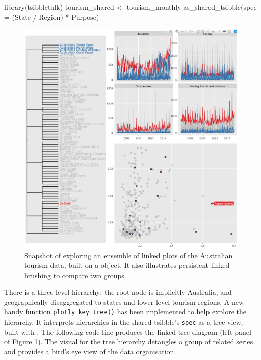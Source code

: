 \begin{Schunk}
\begin{Sinput}
library(tsibbletalk)
tourism_shared <- tourism_monthly %
  as_shared_tsibble(spec = (State / Region) * Purpose)
\end{Sinput}
\end{Schunk}

\begin{Schunk}
\begin{figure}

{\centering \includegraphics[width=\textwidth]{img/tourism-linking} 

}

\caption[Snapshot of exploring an ensemble of linked plots of the Australian tourism data, built on a  object]{Snapshot of exploring an ensemble of linked plots of the Australian tourism data, built on a  object. It also illustrates persistent linked brushing to compare two groups.}\label{fig:tourism-linking-fig}
\end{figure}
\end{Schunk}

\noindent There is a three-level hierarchy: the root node is implicitly
Australia, and geographically disaggregated to states and lower-level
tourism regions. A new handy function \texttt{plotly\_key\_tree()} has
been implemented to help explore the hierarchy. It interprets
hierarchies in the shared tsibble's \texttt{spec} as a tree view, built
with . The following code line produces the linked tree
diagram (left panel of Figure \ref{fig:tourism-linking-fig}). The visual
for the tree hierarchy detangles a group of related series and provides
a bird's eye view of the data organisation.

